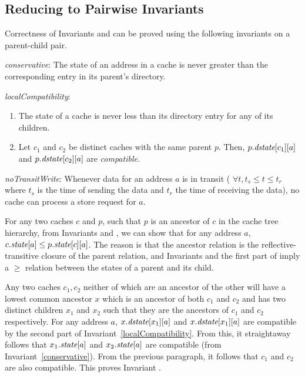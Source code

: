 \subsection{Reducing to Pairwise Invariants}
\label{pairwise}

Correctness of Invariants  and  can be
proved using the following invariants on a parent-child pair.

\begin{inv}
\textit{conservative}: The state of an address in a cache is never greater than
the corresponding entry in its parent's directory.
\label{conservative}
\end{inv}

\begin{inv}
\textit{localCompatibility}:
\begin{enumerate}
\item The state of a cache is never less than its directory entry for any of
its children.
\item Let $c_1$ and $c_2$ be distinct caches with the same parent $p$. Then,
$p.\textit{dstate}[c_1][a]$ and $p.\textit{dstate}[c_2][a]$ are \textit{compatible}.
\end{enumerate}
\label{localCompatibility}
\end{inv}

\begin{inv}
\textit{noTransitWrite}: Whenever data for an address $a$ is in transit (\ie{}
$\forall t, t_s \le t \le t_r$ where $t_s$ is the time of sending the data and
$t_r$ the time of receiving the data), no cache can process a store request for
$a$.
\label{noTransitWrite}
\end{inv}

For any two caches $c$ and $p$, such that $p$ is an ancestor of $c$ in
the cache tree hierarchy, from Invariants  and
, we can show that for any address $a$,
$c.\textit{state}[a] \le p.\textit{state}[c][a]$. The reason is that the ancestor
relation is the reflective-transitive closure of the parent relation,
and Invariants  and the first part
of  imply a $\ge$ relation between the
states of a parent and its child.

Any two caches $c_1, c_2$ neither of which are an ancestor of the
other will have a lowest common ancestor $x$ which is an ancestor of
both $c_1$ and $c_2$ and has two distinct children $x_1$ and $x_2$
such that they are the ancestors of $c_1$ and $c_2$ respectively. For
any address $a$, $x.\textit{dstate}[x_1][a]$ and $x.\textit{dstate}[x_1][a]$ are
compatible by the second part of
Invariant~\ref{localCompatibility}. From this, it straightaway follows
that $x_1.\textit{state}[a]$ and $x_2.\textit{state}[a]$ are compatible (from
Invariant~\ref{conservative}). From the previous paragraph, it follows
that $c_1$ and $c_2$ are also compatible. This proves
Invariant .

